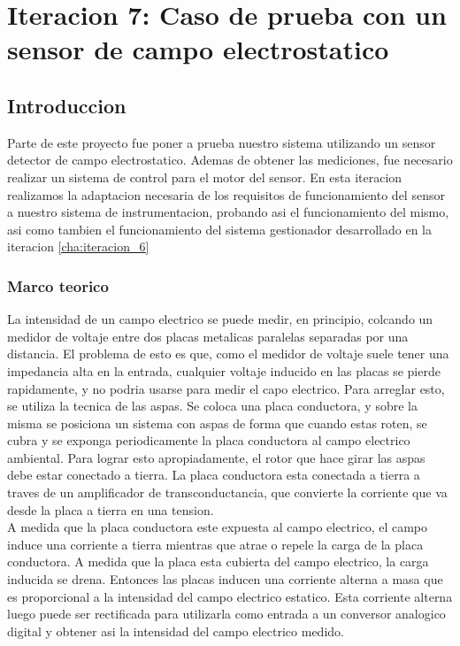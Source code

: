 \chapter{Iteracion 7: Caso de prueba con un sensor de campo electrostatico} %
\label{cha:iteracion_7}

\section{Introduccion} %
\label{sec:introduccion}

Parte de este proyecto fue poner a prueba nuestro sistema utilizando un sensor detector de campo electrostatico. Ademas de obtener las mediciones, fue necesario realizar un sistema de control para el motor del sensor. En esta iteracion realizamos la adaptacion necesaria de los requisitos de funcionamiento del sensor a nuestro sistema de instrumentacion, probando asi el funcionamiento del mismo, asi como tambien el funcionamiento del sistema gestionador desarrollado en la iteracion \ref{cha:iteracion_6} 

\subsection{Marco teorico} %
\label{sub:marco_teorico}

La intensidad de un campo electrico se puede medir, en principio, colcando un medidor de voltaje entre dos placas metalicas paralelas separadas por una distancia. El problema de esto es que, como el medidor de voltaje suele tener una impedancia alta en la entrada, cualquier voltaje inducido en las placas se pierde rapidamente, y no podria usarse para medir el capo electrico. Para arreglar esto, se utiliza la tecnica de las aspas. Se coloca una placa conductora, y sobre la misma se posiciona un sistema con aspas de forma que cuando estas roten, se cubra y se exponga periodicamente la placa conductora al campo electrico ambiental. Para lograr esto apropiadamente, el rotor que hace girar las aspas debe estar conectado a tierra. La placa conductora esta conectada a tierra a traves de un amplificador de transconductancia, que convierte la corriente que va desde la placa a tierra en una tension. \\

A medida que la placa conductora este expuesta al campo electrico, el campo induce una corriente a tierra mientras que atrae o repele la carga de la placa conductora. A medida que la placa esta cubierta del campo electrico, la carga inducida se drena. Entonces las placas inducen una corriente alterna a masa que es proporcional a la intensidad del campo electrico estatico. Esta corriente alterna luego puede ser rectificada para utilizarla como entrada a un conversor analogico digital y obtener asi la intensidad del campo electrico medido. \\

